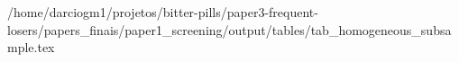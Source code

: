/home/darciogm1/projetos/bitter-pills/paper3-frequent-losers/papers_finais/paper1_screening/output/tables/tab_homogeneous_subsample.tex